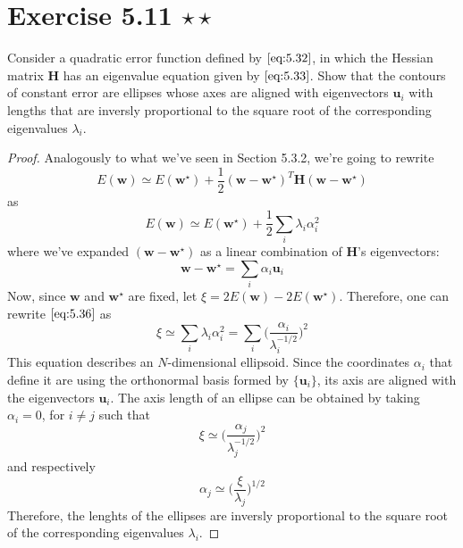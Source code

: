 \section*{Exercise 5.11 $\star \star$}
Consider a quadratic error function defined by $\eqref{eq:5.32}$, in which the
Hessian matrix $\mathbf{H}$ has an eigenvalue equation given by $\eqref{eq:5.33}$.
Show that the contours of constant error are ellipses whose axes are aligned
with eigenvectors $\mathbf{u}_i$ with lengths that are inversly proportional
to the square root of the corresponding eigenvalues $\lambda_i$.

\vspace{1em}

\begin{proof}
    Analogously to what we've seen in Section 5.3.2, we're going
    to rewrite 
    \begin{equation*}
        E(\mathbf{w}) \simeq E(\mathbf{w}^\star) + 
        \frac{1}{2}(\mathbf{w} - \mathbf{w}^\star)^T\mathbf{H}(\mathbf{w} - \mathbf{w}^\star)
        \tag{5.32}\label{eq:5.32}
    \end{equation*}
    as 
    \begin{equation*}
        E(\mathbf{w}) \simeq E(\mathbf{w}^\star) + \frac{1}{2} \sum_{i} \lambda_i \alpha_i^2 
        \tag{5.36}\label{eq:5.36}
    \end{equation*}
    where we've expanded $(\mathbf{w} - \mathbf{w}^\star)$ as a linear combination
    of $\mathbf{H}$'s eigenvectors:
    \begin{equation*}
       \mathbf{w} - \mathbf{w}^\star = \sum_{i} \alpha_i \mathbf{u}_i  
        \tag{5.35}\label{eq:5.35}
    \end{equation*}
    Now, since $\mathbf{w}$ and $\mathbf{w}^\star$ are fixed, let 
    $\xi = 2E(\mathbf{w}) - 2E(\mathbf{w}^\star)$.
    Therefore, one can rewrite $\eqref{eq:5.36}$ as
     \[
         \xi \simeq \sum_{i} \lambda_i\alpha_i^2 
         = \sum_{i} \bigg(\frac{\alpha_i}{\lambda_i^{-1/2}} \bigg)^2
    \] 
    This equation describes an $N$-dimensional ellipsoid. Since
    the coordinates $\alpha_i$ that define it are using the orthonormal
    basis formed by $\{\mathbf{u}_i\}$, its axis are aligned with
    the eigenvectors $\mathbf{u}_i$. The axis length of an
    ellipse can be obtained by taking $\alpha_i = 0$, for
    $i \neq j$ such that
     \[
         \xi \simeq \bigg(\frac{\alpha_j}{\lambda_j^{-1/2}}\bigg)^2
    \] 
    and respectively
    \[
        \alpha_j \simeq \bigg(\frac{\xi}{\lambda_j}\bigg)^{1/2}
    \] 
    Therefore, the lenghts of the ellipses are inversly proportional
    to the square root of the corresponding eigenvalues $\lambda_i$.
\end{proof}

